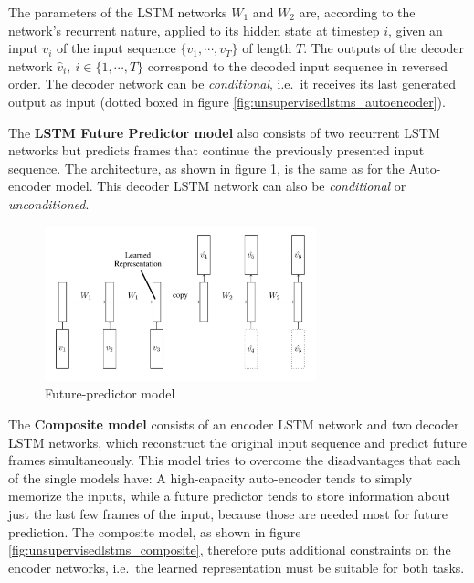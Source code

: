 The parameters of the LSTM networks $W_1$ and $W_2$ are, according to the network's recurrent nature, applied to its hidden state at timestep $i$, given an input $v_i$ of the input sequence $\{v_1, \cdots, v_T\}$ of length $T$.
The outputs of the decoder network $\hat{v}_i,\ i \in \{1,\cdots,T\}$ correspond to the decoded input sequence in reversed order.
The decoder network can be \textit{conditional}, i.e.\ it receives its last generated output as input (dotted boxed in figure \ref{fig:unsupervisedlstms_autoencoder}).

The \textbf{LSTM Future Predictor model} also consists of two recurrent LSTM networks but predicts frames that continue the previously presented input sequence.
The architecture, as shown in figure \ref{fig:unsupervisedlstms_futurepredictor}, is the same as for the Auto-encoder model.
This decoder LSTM network can also be \textit{conditional} or \textit{unconditioned}.

\begin{figure}[H]
    \centering
    \includegraphics[width=0.7\textwidth]{img_deep/unsupervisedlstms_futurepredictor}
    \caption{Future-predictor model \cite{srivastava_unsupervised_2015}}
    \label{fig:unsupervisedlstms_futurepredictor}
\end{figure}

The \textbf{Composite model} consists of an encoder LSTM network and two decoder LSTM networks, which reconstruct the original input sequence and predict future frames simultaneously.
This model tries to overcome the disadvantages that each of the single models have: A high-capacity auto-encoder tends to simply memorize the inputs, while a future predictor tends to store information about just the last few frames of the input, because those are needed most for future prediction.
The composite model, as shown in figure \ref{fig:unsupervisedlstms_composite}, therefore puts additional constraints on the encoder networks, i.e.\ the learned representation must be suitable for both tasks.

